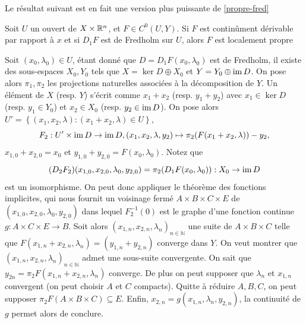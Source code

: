 \documentclass[memoire.tex]{subfiles}
\begin{document}
Le résultat suivant est en fait une version plus puissante de \ref{propre-fred}

\begin{lemme}\label{lemme-loc-prop}
    Soit $U$ un ouvert de $X\times \mathbb{R}^n$, et $F\in C^0(U,Y)$. Si $F$ est continûment dérivable par rapport à $x$ et si $D_1F$ est de Fredholm sur $U$, alors $F$ est localement propre
\end{lemme}
\begin{preuve}
    Soit $(x_0,\lambda_0)\in U$, étant donné que $D=D_1F(x_0,\lambda_0)$ est de Fredholm, il existe des sous-espaces $X_0,Y_0$ tels que $X=\ker D\oplus X_0 $ et $Y=Y_0\oplus \operatorname{im} D$. On pose alors $\pi_1,\pi_2$ les projections naturelles associées à la décomposition de $Y$. Un élément de $X$ (resp. $Y$) s'écrit comme $x_1+x_2$ (resp. $y_1+y_2$) avec $x_1\in \ker D$ (resp. $y_1\in Y_0$) et 
    $x_2\in X_0 $ (resp. $y_2\in\operatorname{im} D$). On pose alors $U'=\left\{(x_1,x_2,\lambda):(x_1+x_2,\lambda)\in U\right\}$,
    \begin{equation*}
        F_2:U'\times \operatorname{im} D\rightarrow \operatorname{im} D,
        (x_1,x_2,\lambda,y_2)\mapsto \pi_2(F(x_1+x_2,\lambda))-y_2,
    \end{equation*}
    $x_{1,0}+x_{2,0}=x_0$ et 
    $y_{1,0}+y_{2,0}=F(x_0,\lambda_0)$.
    Notez que
    \begin{equation*}
        (D_2 F_2)(x_{1,0},x_{2,0},\lambda_0,y_{2,0})=\pi_2(D_1F(x_0,\lambda_0)):X_0\rightarrow  \operatorname{im} D
    \end{equation*}
    est un isomorphisme. On peut donc 
    appliquer le théorème des fonctions 
    implicites, qui nous fournit un 
    voisinage fermé $A\times B\times C\times 
    E$ de $(x_{1,0},x_{2,0},\lambda_0,y_{2,
    0})$ dans lequel $F_2^{-1}(0)$ est le 
    graphe d'une fonction  continue 
    $g:A\times C\times E\rightarrow B$. Soit 
    alors $(x_{1,n},x_{2,n},\lambda_n)_
    {n\in\mathbb{N}}$ une suite de $A\times 
    B\times C$ telle que $F(x_{1,n}+x_{2,n},
    \lambda_n)=(y_{1,n}+y_{2,n})$ converge dans $Y$. On veut montrer que $(x_{1,
    n},x_{2,n},\lambda_n)_
    {n\in\mathbb{N}}$ admet une sous-suite 
    convergente. On sait que $y_{2n}=\pi_2 F(x_{1,n}+x_{2,n},\lambda_n)$ converge. De plus on peut supposer que $\lambda_n$ et $x_{1,n}$ convergent (on peut choisir $A$ et $C$ compacts). Quitte à réduire $A,B,C$, on peut supposer $\pi_2 F(A\times B\times C)\subseteq E$. Enfin, $x_{2,n}=g(x_{1,n},\lambda_n,y_{2,n})$, la continuité de $g$ permet alors de conclure.
\end{preuve}
\end{document}
